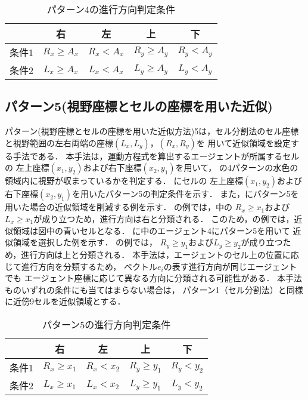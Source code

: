 \begin{table}[t]
	\centering
	\caption{パターン4の進行方向判定条件}
	\label{tb:patan4_joken}
	\begin{tabular}{c|c|c|c|c}
		\hline \hline
		& 右 & 左 & 上 & 下  \\ \hline
		条件1 & $R_x \geq A_x$ & $R_x < A_x$ & $R_y \geq A_y$ & $R_y < A_y $ \\ \hline
	  条件2 & $L_x \geq A_x$ & $L_x < A_x$ & $L_y \geq A_y$ & $L_y < A_y$ \\ \hline
	\end{tabular}
\end{table}




\subsection{パターン5(視野座標とセルの座標を用いた近似)}
パターン(視野座標とセルの座標を用いた近似方法)5は，セル分割法のセル座標と視野範囲の左右両端の座標$(L_x,L_y)$，$(R_x,R_y)$を
用いて近似領域を設定する手法である．
本手法は，運動方程式を算出するエージェントが所属するセルの
左上座標$(x_1,y_2)$および右下座標$(x_2, y_1)$を用いて，
の4パターンの水色の領域内に視野が収まっているかを判定する．
にセルの
左上座標$(x_1,y_2)$および右下座標$(x_2, y_1)$を用いたパターン5の判定条件を示す．
また，にパターン5を用いた場合の近似領域を削減する例を示す．
の例では，中の
$R_x \geq x_1$および$L_x \geq x_1$が成り立つため，進行方向は右と分類される．
このため，の例では，近似領域は図中の青いセルとなる．
に中のエージェント4にパターン5を用いて
近似領域を選択した例を示す．
の例では，
$R_y \geq y_1$および$L_y \geq y_2$が成り立つため，進行方向は上と分類される．
本手法は，エージェントのセル上の位置に応じて進行方向を分類するため，
ベクトル$e_i$の表す進行方向が同じエージェントでも
エージェント座標に応じて異なる方向に分類される可能性がある．
本手法ものいずれの条件にも当てはまらない場合は，
パターン1（セル分割法）と同様に近傍9セルを近似領域とする．

\begin{table}[t]
	\centering
	\caption{パターン5の進行方向判定条件}
	\label{tb:patan5_joken}
	\begin{tabular}{c|c|c|c|c}
		\hline \hline
		& 右 & 左 & 上 & 下  \\ \hline
 		条件1 & $R_x \geq x_1$ & $R_x < x_2$ & $R_y \geq y_1$ & $R_y < y_2 $ \\ \hline
		条件2 & $L_x \geq x_1$ & $L_x < x_2$ & $L_y \geq y_1$ & $L_y < y_2 $ \\ \hline
	\end{tabular}
\end{table}

